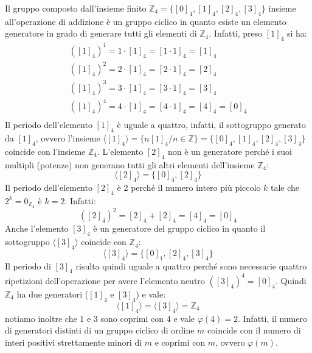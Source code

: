 \begin{example}
	Il gruppo composto dall'insieme finito $\mathbb{Z}_{4}=\{[0]_{4},[1]_{4},[2]_{4},[3]_{4}\}$ insieme all'operazione di addizione è un gruppo ciclico in quanto esiste un elemento generatore in grado di generare tutti gli elementi di $\mathbb{Z}_{4}$. Infatti, preso $[1]_{4}$ si ha:
	\begin{displaymath}
		\begin{array}{l}
			([1]_{4})^{1} = 1 \cdot [1]_{4} =[1 \cdot 1]_{4} = [1]_{4}\\
			([1]_{4})^{2} = 2 \cdot [1]_{4} =[2 \cdot 1]_{4} = [2]_{4}\\
			([1]_{4})^{3} = 3 \cdot [1]_{4} =[3 \cdot 1]_{4} = [3]_{4}\\
			([1]_{4})^{4} = 4 \cdot [1]_{4} =[4 \cdot 1]_{4} = [4]_{4} = [0]_{4}\\
		\end{array}
	\end{displaymath}
	Il periodo dell'elemento $[1]_{4}$ è uguale a quattro, infatti, il sottogruppo generato da $[1]_{4}$, ovvero l'insieme $\langle [1]_{4} \rangle = \{n [1]_{4} / n \in \mathbb{Z}\} = \{[0]_{4},[1]_{4},[2]_{4},[3]_{4}\}$ coincide con l'insieme $\mathbb{Z}_{4}$. L'elemento $[2]_{4}$ non è un generatore perché i suoi multipli (potenze) non generano tutti gli altri elementi dell'insieme $\mathbb{Z}_{4}$:
	\begin{displaymath}
		\langle [2]_{4} \rangle = \{[0]_{4},[2]_{4}\}
	\end{displaymath}
	Il periodo dell'elemento $[2]_{4}$ è 2 perché il numero intero più piccolo $k$ tale che $2^{k} = 0_{\mathbb{Z}_{4}}$ è $k=2$. Infatti:
	\begin{displaymath}
		([2]_{4})^{2} = [2]_{4}+[2]_{4} = [4]_{4} = [0]_{4}
	\end{displaymath}
	Anche l'elemento $[3]_{4}$ è un generatore del gruppo ciclico in quanto il sottogruppo $\langle [3]_{4} \rangle $ coincide con $\mathbb{Z}_{4}$:
	\begin{displaymath}
		\langle [3]_{4} \rangle = \{[0]_{1},[2]_{4},[3]_{4}\}
	\end{displaymath}
	Il periodo di $[3]_{4}$ risulta quindi uguale a quattro perché sono necessarie quattro ripetizioni dell'operazione per avere l'elemento neutro $([3]_{4})^{4}=[0]_{4}$. Quindi $\mathbb{Z}_{4}$ ha due generatori ($[1]_{4}$ e $[3]_{4}$) e vale:
	\begin{displaymath}
		\langle [1]_{4} \rangle = \langle [3]_{4} \rangle = \mathbb{Z}_{4}
	\end{displaymath}
	notiamo inoltre che $1$ e $3$ sono coprimi con $4$ e vale $\varphi(4)=2$. Infatti, il numero di generatori distinti di un gruppo ciclico di ordine $m$ coincide con il numero di interi positivi strettamente minori di $m$ e coprimi con $m$, ovvero $\varphi(m)$.
\end{example}

